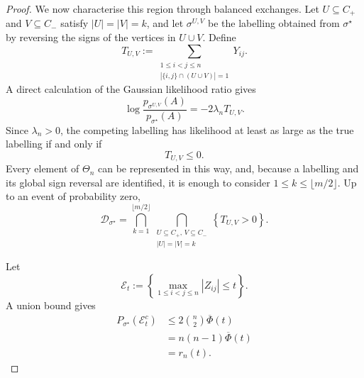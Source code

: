 \documentclass[11pt]{article}
\theoremstyle{definition}
\theoremstyle{remark}
\newcommand{\1}{\boldsymbol{1}}
\begin{document}
\begin{proof}
We now characterise this region through balanced exchanges. Let
\(U\subseteq C_+\) and \(V\subseteq C_-\) satisfy \(|U|=|V|=k\),
and let $\sigma^{U,V}$ be the labelling obtained from
$\sigma^\star$ by reversing the signs of the vertices in $U\cup V$.
Define
\begin{equation}
T_{U,V}
:=
\sum_{\substack{1\leq i<j\leq n\\
|\{i,j\}\cap(U\cup V)|=1}}
Y_{ij}.
\label{eq:gwsbmExchangeStatistic}
\end{equation}
A direct calculation of the Gaussian likelihood ratio gives
\begin{equation}
\log
\frac{
p_{\sigma^{U,V}}(A)
}{
p_{\sigma^\star}(A)
}
=
-2\lambda_n T_{U,V}.
\label{eq:gwsbmExchangeLikelihoodRatio}
\end{equation}
Since $\lambda_n>0$, the competing labelling has likelihood at least
as large as the true labelling if and only if
\begin{equation}
T_{U,V}\leq0.
\label{eq:gwsbmDetrimentalExchange}
\end{equation}
Every element of $\Theta_n$ can be represented in this way, and,
because a labelling and its global sign reversal are identified, it is
enough to consider \(1\leq k\leq\lfloor m/2\rfloor\).
Up to an event of probability zero,
\begin{equation}
\mathcal D_{\sigma^\star}
=
\bigcap_{k=1}^{\lfloor m/2\rfloor}
\bigcap_{\substack{U\subseteq C_+,\,V\subseteq C_-\\
|U|=|V|=k}}
\left\{
T_{U,V}>0
\right\}.
\label{eq:gwsbmMLRegionIntersections}
\end{equation}

Let
\begin{equation}
\mathcal E_t
:=
\left\{
\max_{1\leq i<j\leq n}|Z_{ij}|\leq t
\right\}.
\label{eq:gwsbmBoundedNoiseEvent}
\end{equation}
A union bound gives
\begin{align}
P_{\sigma^\star}
\left(
\mathcal E_t^c
\right)
&\leq
2\binom{n}{2}\overline\Phi(t)\\
&=
n(n-1)\overline\Phi(t)\\
&=
r_n(t).
\label{eq:gwsbmBoundedNoiseProbability}
\end{align}


\end{proof}
\end{document}
